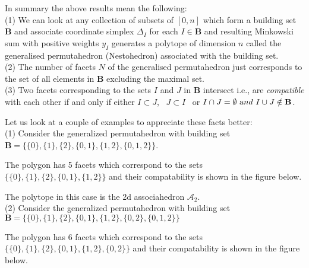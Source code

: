 \documentclass[hidelinks,12pt]{article}
\begin{document}
In summary the above results mean the following:\\

(1) We can look at any collection of subsets of $[0, n]$ which form a building set ${\mathbf B}$ and associate  coordinate simplex $\Delta_I$ for each $I \in {\mathbf B}$ and resulting Minkowski sum with positive weights $y_I$ generates a polytope of dimension $n$ called the generalised permutahedron (Nestohedron) associated with the building set. \\

(2) The number of facets $N$ of the generalised permutahedron just corresponds to the set of all elements in ${\mathbf B}$ excluding the maximal set. \\ 

(3) Two facets corresponding to the sets $I$ and $J$ in ${\mathbf B}$ intersect i.e., are {\it compatible} with each other if and only if  either $I \subset J$,~ $J \subset I$~ or $I \cap J = \emptyset ~{\text and} ~ I \cup J \notin {\mathbf B}$.

Let us look at a couple of examples to appreciate these facts better:\\
(1) Consider the generalized permutahedron with building set ${\mathbf B}= \{ \{0\},\{1\},\{2\},\{0,1\},\{1,2\},\{0,1,2\} \}$.

The polygon has 5 facets which correspond to the sets $\{ \{0\},\{1\},\{2\},\{0,1\},\{1,2\}\}$ and their compatability is shown in the figure below.

The polytope in this case is the 2d associahedron ${\mathscr A_2}$.\\
(2) Consider the generalized permutahedron with building set ${\mathbf B}= \{ \{0\},\{1\},\{2\},\{0,1\},\{1,2\},\{0,2\},\{0,1,2\} \}$ 

The polygon has 6 facets which correspond to the sets $\{ \{0\},\{1\},\{2\},\{0,1\},\{1,2\},\{0,2\}\}$ and their compatability is shown in the figure below.
\end{document}
